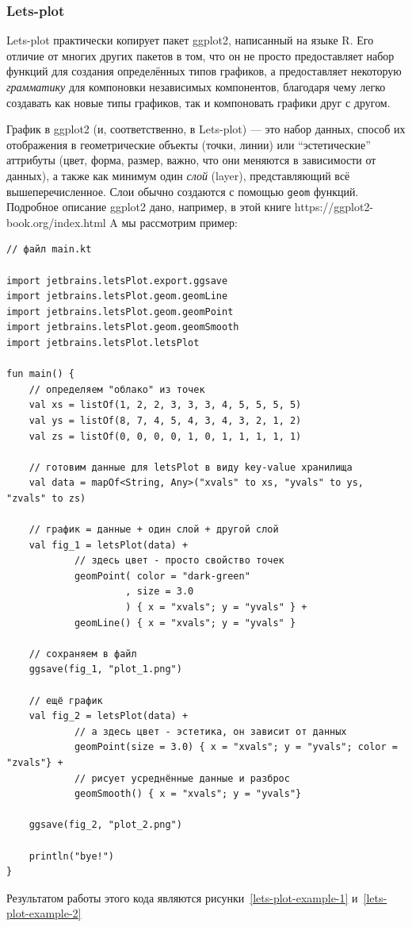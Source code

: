 \documentclass{book}
\begin{document}
\subsubsection{Lets-plot}

Lets-plot практически копирует пакет ggplot2, написанный на языке R. Его отличие от многих других
пакетов в том, что он не просто предоставляет набор функций для создания определённых типов
графиков, а предоставляет некоторую \textit{грамматику} для компоновки независимых компонентов,
благодаря чему легко создавать как новые типы графиков, так и компоновать графики друг с другом.

График в ggplot2 (и, соответственно, в Lets-plot) --- это набор данных, способ их отображения в
геометрические объекты (точки, линии) или ``эстетические'' аттрибуты (цвет, форма, размер, важно,
что они меняются в зависимости от данных), а также как минимум один \textit{слой} (layer),
представляющий всё вышеперечисленное. Слои обычно создаются с помощью
\texttt{geom} функций. Подробное описание ggplot2 дано, например, в этой книге
https://ggplot2-book.org/index.html A мы рассмотрим пример:
\begin{verbatim}
// файл main.kt

import jetbrains.letsPlot.export.ggsave
import jetbrains.letsPlot.geom.geomLine
import jetbrains.letsPlot.geom.geomPoint
import jetbrains.letsPlot.geom.geomSmooth
import jetbrains.letsPlot.letsPlot

fun main() {
    // определяем "облако" из точек
    val xs = listOf(1, 2, 2, 3, 3, 3, 4, 5, 5, 5, 5)
    val ys = listOf(8, 7, 4, 5, 4, 3, 4, 3, 2, 1, 2)
    val zs = listOf(0, 0, 0, 0, 1, 0, 1, 1, 1, 1, 1)

    // готовим данные для letsPlot в виду key-value хранилища
    val data = mapOf<String, Any>("xvals" to xs, "yvals" to ys, "zvals" to zs)

    // график = данные + один слой + другой слой
    val fig_1 = letsPlot(data) +
            // здесь цвет - просто свойство точек
            geomPoint( color = "dark-green"
                     , size = 3.0
                     ) { x = "xvals"; y = "yvals" } +
            geomLine() { x = "xvals"; y = "yvals" }

    // сохраняем в файл
    ggsave(fig_1, "plot_1.png")

    // ещё график
    val fig_2 = letsPlot(data) +
            // а здесь цвет - эстетика, он зависит от данных
            geomPoint(size = 3.0) { x = "xvals"; y = "yvals"; color = "zvals"} +
            // рисует усреднённые данные и разброс
            geomSmooth() { x = "xvals"; y = "yvals"}

    ggsave(fig_2, "plot_2.png")

    println("bye!")
}
\end{verbatim}
Результатом работы этого кода являются рисунки~\ref{lets-plot-example-1}
и~\ref{lets-plot-example-2}
\end{document}
